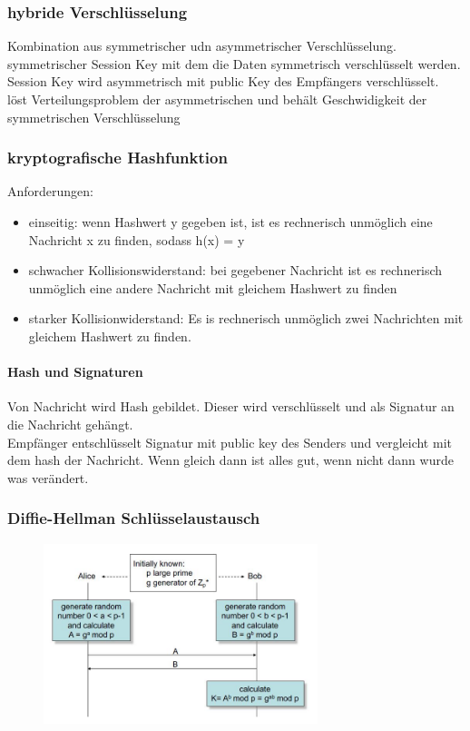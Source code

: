 \documentclass{article} %
\begin{document}
\subsubsection{hybride Verschlüsselung}
Kombination aus symmetrischer udn asymmetrischer Verschlüsselung.\\
symmetrischer Session Key mit dem die Daten symmetrisch verschlüsselt werden.\\
Session Key wird asymmetrisch mit public Key des Empfängers verschlüsselt.\\
löst Verteilungsproblem der asymmetrischen und behält Geschwidigkeit der symmetrischen Verschlüsselung\\
\subsubsection{kryptografische Hashfunktion}
Anforderungen:
\begin{itemize}
	\item einseitig: wenn Hashwert y gegeben ist, ist es rechnerisch unmöglich eine Nachricht x zu finden, sodass h(x) = y
    \item schwacher Kollisionswiderstand: bei gegebener Nachricht ist es rechnerisch unmöglich eine andere Nachricht mit gleichem Hashwert zu finden
    \item starker Kollisionwiderstand: Es is rechnerisch unmöglich zwei Nachrichten mit gleichem Hashwert zu finden.
\end{itemize}
\paragraph{Hash und Signaturen}
Von Nachricht wird Hash gebildet. Dieser wird verschlüsselt und als Signatur an die Nachricht gehängt.\\
Empfänger entschlüsselt Signatur mit public key des Senders und vergleicht mit dem hash der Nachricht. Wenn gleich dann ist alles gut, wenn nicht dann wurde was verändert.\\
\subsubsection{Diffie-Hellman Schlüsselaustausch}
\begin{figure}[h]
	\centering
		\includegraphics[width=8cm]{img/diffiehellman.JPG}
	\label{fig:diffiehellman}
\end{figure}
\end{document}
